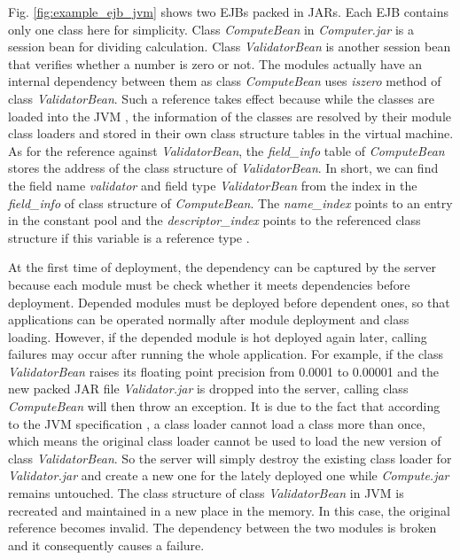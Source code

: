 \documentclass[conference]{IEEEtran}
\begin{document}
Fig. \ref{fig:example_ejb_jvm} shows two EJBs packed in JARs. Each EJB contains only one class here for simplicity. Class \emph{ComputeBean} in \emph{Computer.jar} is a session bean for dividing calculation. Class \emph{ValidatorBean} is another session bean that verifies whether a number is zero or not. The modules actually have an internal dependency between them as class \emph{ComputeBean} uses \emph{iszero} method of class \emph{ValidatorBean}. Such a reference takes effect because while the classes are loaded into the JVM \cite{jvm}, the information of the classes are resolved by their module class loaders and stored in their own class structure tables in the virtual machine. As for the reference against \emph{ValidatorBean}, the \emph{field\_info} table of \emph{ComputeBean} stores the address of the class structure of \emph{ValidatorBean}. In short, we can find the field name \emph{validator} and field type \emph{ValidatorBean} from the index in the \emph{field\_info} of class structure of \emph{ComputeBean}. The \emph{name\_index} points to an entry in the constant pool and the \emph{descriptor\_index} points to the referenced class structure if this variable is a reference type \cite{jvm_book}. 

At the first time of deployment, the dependency can be captured by the server because each module must be check whether it meets dependencies before deployment. Depended modules must be deployed before dependent ones, so that applications can be operated normally after module deployment and class loading. However, if the depended module is hot deployed again later, calling failures may occur after running the whole application. For example, if the class \emph{ValidatorBean} raises its floating point precision from 0.0001 to 0.00001 and the new packed JAR file \emph{Validator.jar} is dropped into the server, calling class \emph{ComputeBean} will then throw an exception. It is due to the fact that according to the JVM specification \cite{jvm_specification}, a class loader cannot load a class more than once, which means the original class loader cannot be used to load the new version of class \emph{ValidatorBean}. So the server will simply destroy the existing class loader for \emph{Validator.jar} and create a new one for the lately deployed one while \emph{Compute.jar} remains untouched. The class structure of class \emph{ValidatorBean} in JVM is recreated and maintained in a new place in the memory. In this case, the original reference becomes invalid. The dependency between the two modules is broken and it consequently causes a failure.
\end{document}
